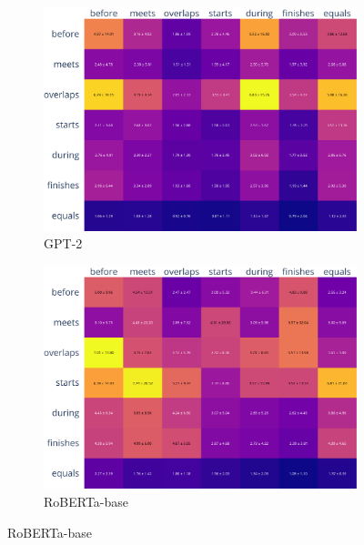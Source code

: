 \documentclass[11pt]{article}
\begin{document}
\begin{figure}
  \centering
    \begin{subfigure}[b]{0.95\textwidth}
      \centering
      \includegraphics[width=0.95\columnwidth, height=0.3\textheight, keepaspectratio, valign=c]{../plots/gpt2_confusion_matrix_values_normalized.pdf}
      \caption{GPT-2}
    \end{subfigure}

    \vspace{1em}

    \begin{subfigure}[b]{0.95\textwidth}
      \centering
      \includegraphics[width=0.95\columnwidth, height=0.3\textheight, keepaspectratio, valign=c]{../plots/roberta-base_confusion_matrix_values_normalized.pdf}
      \caption{RoBERTa-base}
    \end{subfigure}


\end{figure}
\end{document}
